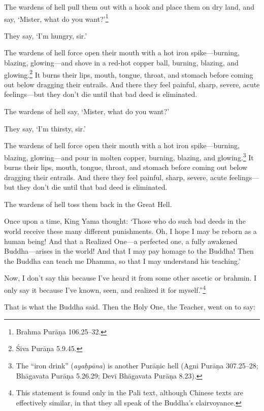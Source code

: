 \documentclass[12pt,openany]{book}%
\begin{document}
The wardens of hell pull them out with a hook and place them on dry land, and say, ‘Mister, what do you want?’\footnote{Brahma \textsanskrit{Purāṇa} 106.25–32. } 

They say, ‘I’m hungry, sir.’ 

The wardens of hell force open their mouth with a hot iron spike—burning, blazing, glowing—and shove in a red-hot copper ball, burning, blazing, and glowing.\footnote{Śiva \textsanskrit{Purāṇa} 5.9.45. } It burns their lips, mouth, tongue, throat, and stomach before coming out below dragging their entrails. And there they feel painful, sharp, severe, acute feelings—but they don’t die until that bad deed is eliminated. 

The wardens of hell say, ‘Mister, what do you want?’ 

They say, ‘I’m thirsty, sir.’ 

The wardens of hell force open their mouth with a hot iron spike—burning, blazing, glowing—and pour in molten copper, burning, blazing, and glowing.\footnote{The “iron drink” (\textit{\textsanskrit{ayaḥpāna}}) is another \textsanskrit{Purāṇic} hell (Agni \textsanskrit{Purāṇa} 307.25–28; \textsanskrit{Bhāgavata} \textsanskrit{Purāṇa} 5.26.29; \textsanskrit{Devī} \textsanskrit{Bhāgavata} \textsanskrit{Purāṇa} 8.23). } It burns their lips, mouth, tongue, throat, and stomach before coming out below dragging their entrails. And there they feel painful, sharp, severe, acute feelings—but they don’t die until that bad deed is eliminated. 

The wardens of hell toss them back in the Great Hell. 

Once upon a time, King Yama thought: ‘Those who do such bad deeds in the world receive these many different punishments. Oh, I hope I may be reborn as a human being! And that a Realized One—a perfected one, a fully awakened Buddha—arises in the world! And that I may pay homage to the Buddha! Then the Buddha can teach me Dhamma, so that I may understand his teaching.’ 

Now, I don’t say this because I’ve heard it from some other ascetic or brahmin. I only say it because I’ve known, seen, and realized it for myself.”\footnote{This statement is found only in the Pali text, although Chinese texts are effectively similar, in that they all speak of the Buddha’s clairvoyance. } 

That is what the Buddha said. Then the Holy One, the Teacher, went on to say: 
\end{document}
